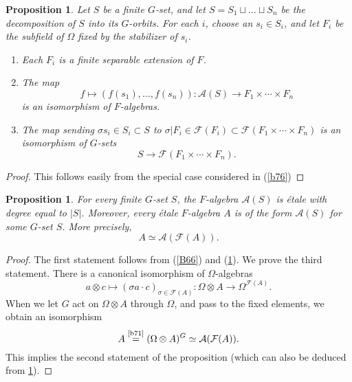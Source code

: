 \documentclass[a4paper,11pt,final,openany]{memoir}
\newtheorem{proposition}[X]{Proposition}
\theoremstyle{nonumberplain}
\newtheorem{proof}{Proof.}
\begin{document}
\begin{proposition}
\label{b77}Let $S$ be a finite $G$-set, and let $S=S_{1}\sqcup\ldots\sqcup
S_{n}$ be the decomposition of $S$ into its $G$-orbits. For each $i$, choose
an $s_{i}\in S_{i}$, and let $F_{i}$ be the subfield of $\Omega$ fixed by the
stabilizer of $s_{i}$.

\begin{enumerate}
\item Each $F_{i}$ is a finite separable extension of $F$.

\item The map%
\[
f\mapsto(f(s_{1}),\ldots,f(s_{n}))\colon\mathcal{A}{}(S)\rightarrow
F_{1}\times\cdots\times F_{n}%
\]
is an isomorphism of $F$-algebras.

\item The map sending $\sigma s_{i}\in S_{i}\subset S$ to $\sigma|F_{i}%
\in\mathcal{F}{}(F_{i})\subset\mathcal{F}{}(F_{1}\times\cdots\times F_{n})$ is
an isomorphism of $G$-sets%
\[
S\rightarrow\mathcal{F}{}\left(  F_{1}\times\cdots\times F_{n}\right)
\text{.}%
\]

\end{enumerate}
\end{proposition}

\begin{proof}
This follows easily from the special case considered in (\ref{b76})
\end{proof}

\begin{proposition}
\label{b78}For every finite $G$-set $S$, the $F$-algebra $\mathcal{A}{}(S)$ is
\'{e}tale with degree equal to $|S|$. Moreover, every \'{e}tale $F$-algebra
$A$ is of the form $\mathcal{A}{}(S)$ for some $G$-set $S$. More precisely,%
\[
A\simeq\mathcal{A}{}(\mathcal{F}{}(A)).
\]

\end{proposition}

\begin{proof}
The first statement follows from (\ref{B66}) and (\ref{b77}). We prove the
third statement. There is a canonical isomorphism of $\Omega$-algebras%
\[
a\otimes c\mapsto(\sigma a\cdot c)_{\sigma\in\mathcal{F}{}(A)}\colon
\Omega\otimes A\rightarrow\Omega^{\mathcal{F}{}(A)}.
\]
When we let $G$ act on $\Omega\otimes A$ through $\Omega$, and pass to the
fixed elements, we obtain an isomorphism%
\[
A\overset{\text{\ref{b71}}}{=}(\Omega\otimes A)^{G}\simeq\mathcal{A}%
{}(\mathcal{F}{}(A)).
\]
This implies the second statement of the proposition (which can also be
deduced from \ref{b77}).
\end{proof}
\end{document}
